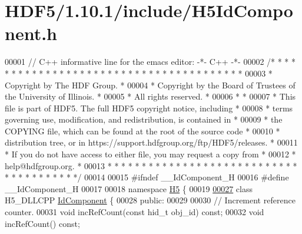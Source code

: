 \hypertarget{_h_d_f5_21_810_81_2include_2_h5_id_component_8h_source}{}\section{H\+D\+F5/1.10.1/include/\+H5\+Id\+Component.h}
\label{_h_d_f5_21_810_81_2include_2_h5_id_component_8h_source}

\begin{DoxyCode}
00001 \textcolor{comment}{// C++ informative line for the emacs editor: -*- C++ -*-}
00002 \textcolor{comment}{/* * * * * * * * * * * * * * * * * * * * * * * * * * * * * * * * * * * * * * *}
00003 \textcolor{comment}{ * Copyright by The HDF Group.                                               *}
00004 \textcolor{comment}{ * Copyright by the Board of Trustees of the University of Illinois.         *}
00005 \textcolor{comment}{ * All rights reserved.                                                      *}
00006 \textcolor{comment}{ *                                                                           *}
00007 \textcolor{comment}{ * This file is part of HDF5.  The full HDF5 copyright notice, including     *}
00008 \textcolor{comment}{ * terms governing use, modification, and redistribution, is contained in    *}
00009 \textcolor{comment}{ * the COPYING file, which can be found at the root of the source code       *}
00010 \textcolor{comment}{ * distribution tree, or in https://support.hdfgroup.org/ftp/HDF5/releases.  *}
00011 \textcolor{comment}{ * If you do not have access to either file, you may request a copy from     *}
00012 \textcolor{comment}{ * help@hdfgroup.org.                                                        *}
00013 \textcolor{comment}{ * * * * * * * * * * * * * * * * * * * * * * * * * * * * * * * * * * * * * * */}
00014 
00015 \textcolor{preprocessor}{#ifndef \_\_IdComponent\_H}
00016 \textcolor{preprocessor}{#define \_\_IdComponent\_H}
00017 
00018 \textcolor{keyword}{namespace }\hyperlink{namespace_h5}{H5} \{
00019 
\hyperlink{class_h5_1_1_id_component}{00027} \textcolor{keyword}{class }H5\_DLLCPP \hyperlink{class_h5_1_1_id_component}{IdComponent} \{
00028     \textcolor{keyword}{public}:
00029 
00030         \textcolor{comment}{// Increment reference counter.}
00031         \textcolor{keywordtype}{void} incRefCount(\textcolor{keyword}{const} hid\_t obj\_id) \textcolor{keyword}{const};
00032         \textcolor{keywordtype}{void} incRefCount() \textcolor{keyword}{const};

\end{DoxyCode}
